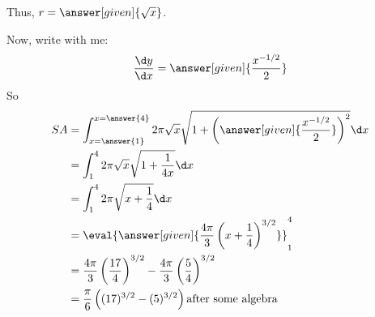 \documentclass{ximera}
\begin{document}
\begin{example}
\begin{explanation}
    \begin{multipleChoice}
    \end{multipleChoice}

Thus, $r= \answer[given]{\sqrt{x}}$.
     
Now, write with me:
    \[
    \frac{\d y}{\d x} = \answer[given]{\frac{x^{-1/2}}{2}}
    \]
    So
    \begin{align*}
      SA &= \int_{x=\answer{1}}^{x=\answer{4}} 2\pi \sqrt{x} \sqrt{1 + \left(\answer[given]{\frac{x^{-1/2}}{2}}\right)^2} \d x\\
      &= \int_1^4 2\pi \sqrt{x} \sqrt{1 + \frac{1}{4x}} \d x\\
      &= \int_1^4 2\pi \sqrt{x+\frac{1}{4}} \d x\\
      &= \eval{\answer[given]{\frac{4\pi}{3}\left(x+\frac{1}{4}\right)^{3/2}}}_1^4\\
      &= \frac{4\pi}{3}\left(\frac{17}{4}\right)^{3/2}  - \frac{4\pi}{3}\left(\frac{5}{4}\right)^{3/2} \\
      &= \frac{\pi}{6} \left((17)^{3/2}-(5)^{3/2} \right) \textrm{after some algebra} 
    \end{align*}
  \end{explanation}
\end{example}
\end{document}
